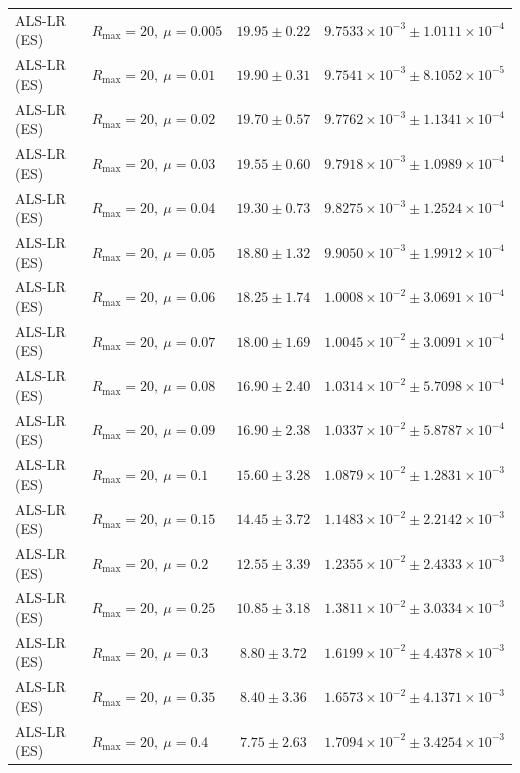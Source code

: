 \begin{table}[t]
\begin{tabular}{@{}llcc@{}}
ALS-LR (ES) & \(R_{\max}=20,\ \mu=0.005\) & \(19.95 \pm 0.22\) & \(9.7533{\times}10^{-3} \pm 1.0111{\times}10^{-4}\) \\
ALS-LR (ES) & \(R_{\max}=20,\ \mu=0.01\) & \(19.90 \pm 0.31\) & \(9.7541{\times}10^{-3} \pm 8.1052{\times}10^{-5}\) \\
ALS-LR (ES) & \(R_{\max}=20,\ \mu=0.02\) & \(19.70 \pm 0.57\) & \(9.7762{\times}10^{-3} \pm 1.1341{\times}10^{-4}\) \\
ALS-LR (ES) & \(R_{\max}=20,\ \mu=0.03\) & \(19.55 \pm 0.60\) & \(9.7918{\times}10^{-3} \pm 1.0989{\times}10^{-4}\) \\
ALS-LR (ES) & \(R_{\max}=20,\ \mu=0.04\) & \(19.30 \pm 0.73\) & \(9.8275{\times}10^{-3} \pm 1.2524{\times}10^{-4}\) \\
ALS-LR (ES) & \(R_{\max}=20,\ \mu=0.05\) & \(18.80 \pm 1.32\) & \(9.9050{\times}10^{-3} \pm 1.9912{\times}10^{-4}\) \\
ALS-LR (ES) & \(R_{\max}=20,\ \mu=0.06\) & \(18.25 \pm 1.74\) & \(1.0008{\times}10^{-2} \pm 3.0691{\times}10^{-4}\) \\
ALS-LR (ES) & \(R_{\max}=20,\ \mu=0.07\) & \(18.00 \pm 1.69\) & \(1.0045{\times}10^{-2} \pm 3.0091{\times}10^{-4}\) \\
ALS-LR (ES) & \(R_{\max}=20,\ \mu=0.08\) & \(16.90 \pm 2.40\) & \(1.0314{\times}10^{-2} \pm 5.7098{\times}10^{-4}\) \\
ALS-LR (ES) & \(R_{\max}=20,\ \mu=0.09\) & \(16.90 \pm 2.38\) & \(1.0337{\times}10^{-2} \pm 5.8787{\times}10^{-4}\) \\
ALS-LR (ES) & \(R_{\max}=20,\ \mu=0.1\) & \(15.60 \pm 3.28\) & \(1.0879{\times}10^{-2} \pm 1.2831{\times}10^{-3}\) \\
ALS-LR (ES) & \(R_{\max}=20,\ \mu=0.15\) & \(14.45 \pm 3.72\) & \(1.1483{\times}10^{-2} \pm 2.2142{\times}10^{-3}\) \\
ALS-LR (ES) & \(R_{\max}=20,\ \mu=0.2\) & \(12.55 \pm 3.39\) & \(1.2355{\times}10^{-2} \pm 2.4333{\times}10^{-3}\) \\
ALS-LR (ES) & \(R_{\max}=20,\ \mu=0.25\) & \(10.85 \pm 3.18\) & \(1.3811{\times}10^{-2} \pm 3.0334{\times}10^{-3}\) \\
ALS-LR (ES) & \(R_{\max}=20,\ \mu=0.3\) & \(8.80 \pm 3.72\) & \(1.6199{\times}10^{-2} \pm 4.4378{\times}10^{-3}\) \\
ALS-LR (ES) & \(R_{\max}=20,\ \mu=0.35\) & \(8.40 \pm 3.36\) & \(1.6573{\times}10^{-2} \pm 4.1371{\times}10^{-3}\) \\
ALS-LR (ES) & \(R_{\max}=20,\ \mu=0.4\) & \(7.75 \pm 2.63\) & \(1.7094{\times}10^{-2} \pm 3.4254{\times}10^{-3}\) \\

\end{tabular}
\end{table}
